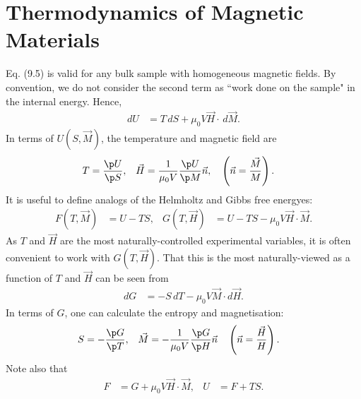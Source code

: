 \documentclass[qo.tex]{subfiles}
\begin{document}
\section{Thermodynamics of Magnetic Materials}
Eq. (9.5) is valid for any bulk sample with homogeneous magnetic fields. 
By convention, we do not consider the second term as ``work done on the sample" in the internal energy.
Hence, 
\begin{align}
    dU &= T\,dS + \mu_0V\vec{H}\cdot\,d\vec{M}.
\end{align}
In terms of $U(S,\vec{M})$, the temperature and magnetic field are
\begin{align}
    T &= \frac{\p U}{\p S}, & \vec{H} &= \frac{1}{\mu_0V}\frac{\p U}{\p M}\vec{n},\quad \left(\vec{n}=\frac{\vec{M}}{M}\right).
\end{align}
It is useful to define analogs of the Helmholtz and Gibbs free energyes:
\begin{align}
    F(T,\vec{M}) &= U - TS, & G(T,\vec{H}) &= U-TS-\mu_0V\vec{H}\cdot\vec{M}.
\end{align}
As $T$ and $\vec{H}$ are the most naturally-controlled experimental variables, it is often convenient to work with $G(T,\vec{H})$. 
That this is the most naturally-viewed as a function of $T$ and $\vec{H}$ can be seen from 
\begin{align}
    dG &= -S\,dT - \mu_0V\vec{M}\cdot d\vec{H}.
\end{align}
In terms of $G$, one can calculate the entropy and magnetisation:
\begin{align}
    S &= -\frac{\p G}{\p T}, & \vec{M} &= -\frac{1}{\mu_0V}\frac{\p G}{\p H}\vec{n}\quad \left(\vec{n}=\frac{\vec{H}}{H}\right).
\end{align}
Note also that 
\begin{align}
    F &= G+\mu_0V\vec{H}\cdot\vec{M}, & U &= F+TS.
\end{align}
\end{document}
